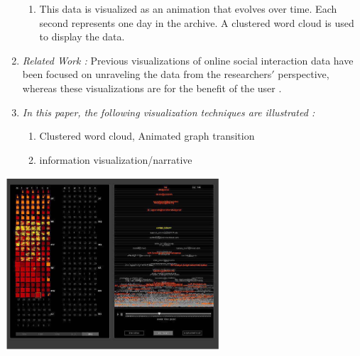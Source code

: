 \documentclass{egpubl}
\begin{document}
\begin{enumerate}
\begin{enumerate}
\item This data is visualized as an animation that evolves over time. Each second represents one day in the archive. A clustered word cloud is used to display the data.
\end{enumerate}
\item \textit{Related Work :} Previous visualizations of online social interaction data have been focused on unraveling the data from the researchers$'$ perspective, whereas these visualizations are for the benefit of the user \cite{boyd2002,donath1995}.
\item \textit{In this paper, the following visualization techniques are illustrated :} 
\begin{enumerate}
\item Clustered word cloud, Animated graph transition
\item information visualization/narrative
\end{enumerate}
\end{enumerate}
\begingroup
\centering
\includegraphics[width=8cm]{./images/viegas2004}
\label{fig:viegas2004}
\endgroup
\end{document}
